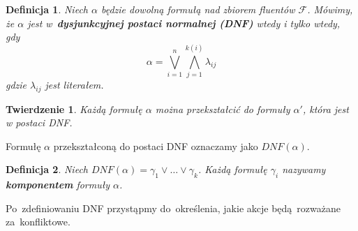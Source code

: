 \documentclass[11pt,a4paper]{article}
\newtheorem{defn}{Definicja}
\newtheorem{theorem}{Twierdzenie}
\begin{document}
\begin{defn}
    \label{defn:dnf}
    Niech $\alpha$ będzie dowolną formułą nad zbiorem fluentów $\mathcal{F}$.
    Mówimy, że $\alpha$ jest w~\textbf{dysjunkcyjnej postaci normalnej (DNF)} wtedy i tylko wtedy, gdy 
    $$\alpha = \bigvee_{i=1}^{n} \bigwedge_{j=1}^{k(i)} \lambda_{ij}$$
    gdzie $\lambda_{ij}$ jest literałem.
\end{defn}
    
\begin{theorem}
    \label{thm:dnf-reduction}
    Każdą formułę $\alpha$ można przekształcić do formuły $\alpha'$, która jest w postaci DNF.
\end{theorem}

Formułę $\alpha$ przekształconą do postaci DNF oznaczamy jako $DNF(\alpha)$.

\begin{defn}
    \label{defn:component}
    Niech $DNF(\alpha) = \gamma_1 \vee \dots \vee \gamma_k$.
    Każdą formułę $\gamma_i$ nazywamy \textbf{komponentem} formuły $\alpha$.
\end{defn}

Po~zdefiniowaniu DNF przystąpmy do~określenia, jakie akcje będą~rozważane za~konfliktowe.
\end{document}
